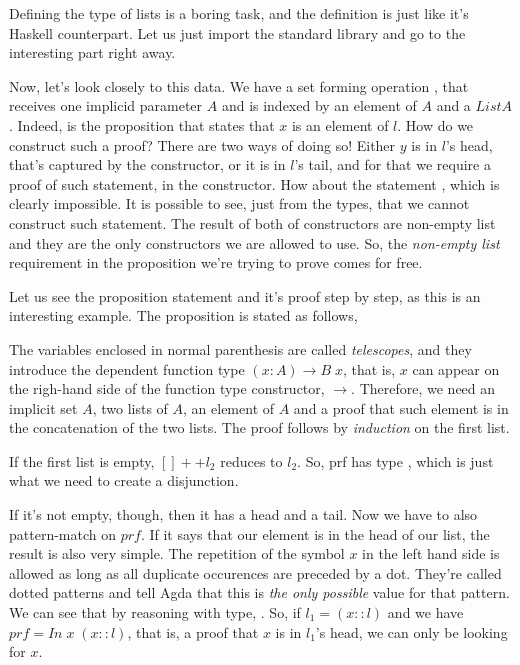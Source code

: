 Defining the type of lists is a boring task, and the definition is just like
it's Haskell counterpart. Let us just import the standard library and go to the
interesting part right away.


Now, let's look closely to this data. We have a set forming operation , that receives
one implicid parameter $A$ and is indexed by an element of $A$ and a $List A$. Indeed, 
is the proposition that states that $x$ is an element of $l$. How do we construct such a proof?
There are two ways of doing so! Either $y$ is in $l$'s head, that's captured by the 
constructor, or it is in $l$'s tail, and for that we require a proof of such statement, in the 
constructor. How about the statement , which is clearly impossible. It is possible to see,
just from the types, that we cannot construct such statement. The result of both of  constructors
are non-empty list and they are the only constructors we are allowed to use. So, the \emph{non-empty list}
requirement in the proposition we're trying to prove comes for free.

Let us see the proposition statement and it's proof step by step, as this is an interesting example.
The proposition is stated as follows,


The variables enclosed in normal parenthesis are called \emph{telescopes}, and they introduce
the dependent function type $(x : A) \rightarrow B\;x$, that is, $x$ can appear on the righ-hand side of
the function type constructor, $\rightarrow$. Therefore, we need an implicit set $A$, two lists of $A$,
an element of $A$ and a proof that such element is in the concatenation of the two lists.
The proof follows by \emph{induction} on the first list. 


If the first list is empty, $[] ++ l_2$ reduces to $l_2$. So, prf has type , which
is just what we need to create a disjunction.


If it's not empty, though, then it has a head and a tail. Now we have to also pattern-match
on $prf$. If it says that our element is in the head of our list, the result is also very simple.
The repetition of the symbol $x$ in the left hand side is allowed as long as all duplicate occurences
are preceded by a dot. They're called dotted patterns and tell Agda that this is \emph{the only possible}
value for that pattern. We can see that by reasoning with  type, . 
So, if $l_1 = (x :: l)$ and we have $prf = In\; x\; (x :: l)$, that is, a proof that $x$ is in $l_1$'s head,
we can only be looking for $x$. 

